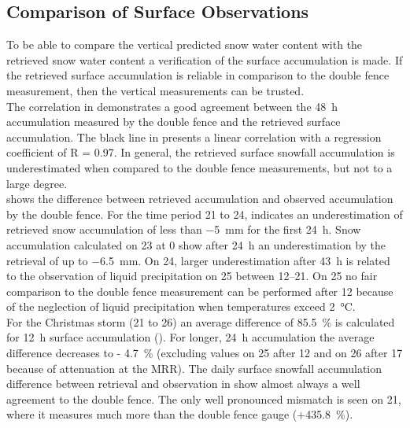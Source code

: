 \subsection{Comparison of Surface Observations} \label{sec:ret_dofe_comp}
To be able to compare the vertical predicted snow water content with the retrieved snow water content a verification of the surface accumulation is made. If the retrieved surface accumulation is reliable in comparison to the double fence measurement, then the vertical measurements can be trusted.
\\
The correlation in  demonstrates a good agreement between the \SI{48}{\hour} accumulation measured by the double fence and the retrieved surface accumulation.
The black line in  presents a linear correlation with a regression coefficient of R = \num{0.97}. 
In general, the retrieved surface snowfall accumulation is underestimated when compared to the double fence measurements, but not to a large degree. 
\\
 shows the difference between retrieved accumulation and observed accumulation by the double fence. For the time period \num{21} to \SI{24}{\dec},  indicates an underestimation of retrieved snow accumulation of less than \SI{-5}{\mm} for the first \SI{24}{\hour}. 
Snow accumulation calculated on \SI{23}{\dec} at \SI{0}{\UTC} show after \SI{24}{\hour} an underestimation by the retrieval of up to \SI{-6.5}{\mm}. On \SI{24}{\dec}, larger underestimation after \SI{43}{\hour} is related to the observation of liquid precipitation on \SI{25}{\dec} between \SIrange{12}{21}{\UTC}. On \SI{25}{\dec} no fair comparison to the double fence measurement can be performed after \SI{12}{\UTC} because of the neglection of liquid precipitation when temperatures exceed \SI{2}{\celsius}.
\\
For the Christmas storm (\num{21} to \SI{26}{\dec}) an average difference of \SI{85.5}{\percent} is calculated for \SI{12}{\hour} surface accumulation %
(). For longer, \SI{24}{\hour} accumulation the average difference decreases to \SI{- 4.7}{\percent} (excluding values on \SI{25}{\dec} after \SI{12}{\UTC} and on \SI{26}{\dec} after \SI{17}{\UTC} because of attenuation at the MRR). The daily surface snowfall accumulation difference between retrieval and observation in  show almost always a well agreement to the double fence. The only well pronounced mismatch is seen on \SI{21}{\dec}, where it measures much more than the double fence gauge (+\SI{435.8}{\percent}).
